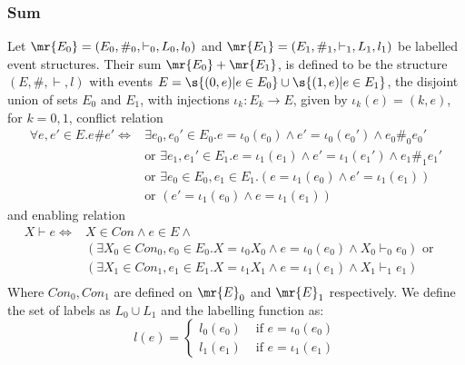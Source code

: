 \subsubsection{Sum}
\begin{definition}[Sum]
    Let $\mr{E_0} = (E_0,\#_0,\vdash_0,L_0,l_0)$ and
    $\mr{E_1} = (E_1,\#_1,\vdash_1,L_1,l_1)$ be labelled event structures.
    Their sum $\mr{E_0} + \mr{E_1}$, is defined to be the structure $(E,\#,\vdash,l)$
    with events $E = \s{(0,e)|e \in E_0} \cup \s{(1,e)|e \in E_1}$,
    the disjoint union of sets $E_0$ and $E_1$,
    with injections $\iota_k: E_k \rightarrow E$, given by
    $\iota_k(e) = (k,e)$, for $k=0,1$, conflict relation
    \begin{align*}
        \forall e,e' \in E.
        e \# e' \iff & \exists e_0,e_0' \in E_0. e = \iota_0(e_0)
        \wedge e' = \iota_0(e_0') \wedge e_0 \#_0e_0'                                                      \\
                     & \text{or } \exists e_1,e_1' \in E_1. e = \iota_1(e_1) \wedge
        e' = \iota_1(e_1') \wedge e_1 \#_1 e_1'                                                            \\
                     & \text{or } \exists e_0 \in E_0,e_1 \in E_1.(e=\iota_1(e_0) \wedge e' =\iota_1(e_1)) \\
                     & \text{or } (e'=\iota_1(e_0) \wedge e =\iota_1(e_1))
    \end{align*}
    and enabling relation
    \begin{align*}
        X \vdash e \iff & X \in Con \wedge e \in E \wedge                   & \\
                        & (\exists X_0 \in Con_0,e_0 \in E_0.X = \iota_0X_0
        \wedge e = \iota_0(e_0) \wedge X_0 \vdash_0 e_0) \text{ or }          \\
                        & (\exists X_1 \in Con_1,e_1 \in E_1.X = \iota_1X_1
        \wedge e = \iota_1(e_1) \wedge X_1 \vdash_1 e_1)                      \\
    \end{align*}
    Where $Con_0,Con_1$ are defined on $\mr{E}_0$ and $\mr{E}_1$ respectively.
    We define the set of labels as $L_0 \cup L_1$ and the labelling function as:
    $$
        l(e) = \begin{cases}
            l_0(e_0) & \text{ if } e = \iota_0(e_0) \\
            l_1(e_1) & \text{ if } e = \iota_1(e_1)
        \end{cases}
    $$
\end{definition}

